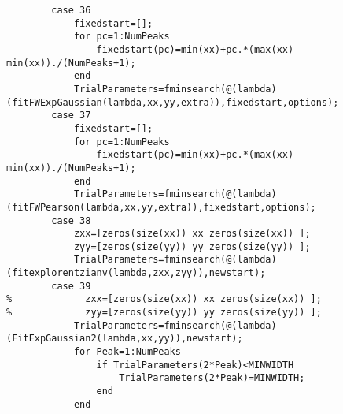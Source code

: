 \begin{lstlisting}
        case 36
            fixedstart=[];
            for pc=1:NumPeaks
                fixedstart(pc)=min(xx)+pc.*(max(xx)-min(xx))./(NumPeaks+1);
            end
            TrialParameters=fminsearch(@(lambda)(fitFWExpGaussian(lambda,xx,yy,extra)),fixedstart,options);
        case 37
            fixedstart=[];
            for pc=1:NumPeaks
                fixedstart(pc)=min(xx)+pc.*(max(xx)-min(xx))./(NumPeaks+1);
            end
            TrialParameters=fminsearch(@(lambda)(fitFWPearson(lambda,xx,yy,extra)),fixedstart,options);
        case 38
            zxx=[zeros(size(xx)) xx zeros(size(xx)) ];
            zyy=[zeros(size(yy)) yy zeros(size(yy)) ];
            TrialParameters=fminsearch(@(lambda)(fitexplorentzianv(lambda,zxx,zyy)),newstart);         
        case 39
%             zxx=[zeros(size(xx)) xx zeros(size(xx)) ];
%             zyy=[zeros(size(yy)) yy zeros(size(yy)) ];
            TrialParameters=fminsearch(@(lambda)(FitExpGaussian2(lambda,xx,yy)),newstart);         
            for Peak=1:NumPeaks
                if TrialParameters(2*Peak)<MINWIDTH
                    TrialParameters(2*Peak)=MINWIDTH;
                end
            end
  

\end{lstlisting}
